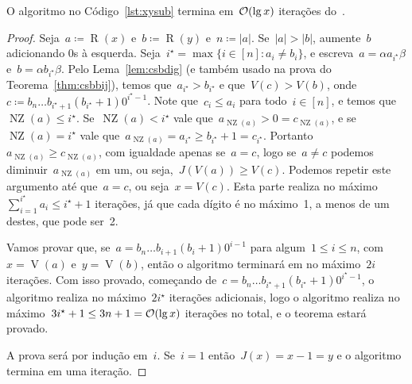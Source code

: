 \documentclass[main.tex]{subfiles}
\newcommand{\NZ}{\operatorname{NZ}}
\renewcommand{\V}{\operatorname{V}}
\newcommand{\R}{\operatorname{R}}
\begin{document}
\begin{theorem} \label{thm:xysub}
	O algoritmo no Código~\ref{lst:xysub} termina em~$\mathcal{O}(\lg x)$ iterações do~.
\end{theorem}
\begin{proof}
	Seja~$a \coloneqq \R(x)$ e~$b \coloneqq \R(y)$ e~$n \coloneqq |a|$. Se~$|a| > |b|$, aumente~$b$ adicionando 0s à esquerda. Seja~${i^\star = \max\{i \in [n] : a_i \neq b_i\}}$, e escreva~${a = \alpha a_{i^\star} \beta}$ e~${b = \alpha b_{i^\star} \beta}$. Pelo Lema~\ref{lem:csbdig} (e também usado na prova do Teorema~\ref{thm:csbbij}), temos que~$a_{i^\star} > b_{i^\star}$ e que~${V(c) > V(b)}$, onde~${c \coloneqq b_n \ldots b_{i^\star + 1} (b_{i^\star} + 1) 0^{i^\star - 1}}$. Note que~$c_i \leq a_i$ para todo~${i \in [n]}$, e temos que~$\NZ(a) \leq i^\star$. Se~$\NZ(a) < i^\star$ vale que~$a_{\NZ(a)} > 0 = c_{\NZ(a)}$, e se~$\NZ(a) = i^\star$ vale que~${a_{\NZ(a)} = a_{i^\star} \geq b_{i^\star} + 1 = c_{i^\star}}$. Portanto~$a_{\NZ(a)} \geq c_{\NZ(a)}$, com igualdade apenas se~$a = c$, logo se~$a \neq c$ podemos diminuir~$a_{\NZ(a)}$ em um, ou seja,~$J(V(a)) \geq V(c)$. Podemos repetir este argumento até que~$a = c$, ou seja~$x = V(c)$. Esta parte realiza no máximo~${\sum\limits_{i = 1}^{i^\star}{a_i} \leq i^\star + 1}$ iterações, já que cada dígito é no máximo~1, a menos de um destes, que pode ser~2.

	Vamos provar que, se~${a = b_n \ldots b_{i+1} (b_i + 1) 0^{i-1}}$ para algum~$1 \leq i \leq n$, com~$x = \V(a)$ e~$y = \V(b)$, então o algoritmo terminará em no máximo~$2i$ iterações. Com isso provado, começando de~${c = b_n \ldots b_{i^\star + 1} (b_{i^\star} + 1) 0^{i^\star - 1}}$, o algoritmo realiza no máximo~$2i^\star$ iterações adicionais, logo o algoritmo realiza no máximo~${3i^\star + 1 \leq 3n+1 = \mathcal{O}(\lg x)}$ iterações no total, e o teorema estará provado.

	A prova será por indução em~$i$. Se~$i = 1$ então~${J(x) = x - 1 = y}$ e o algoritmo termina em uma iteração.


\end{proof}
\end{document}
